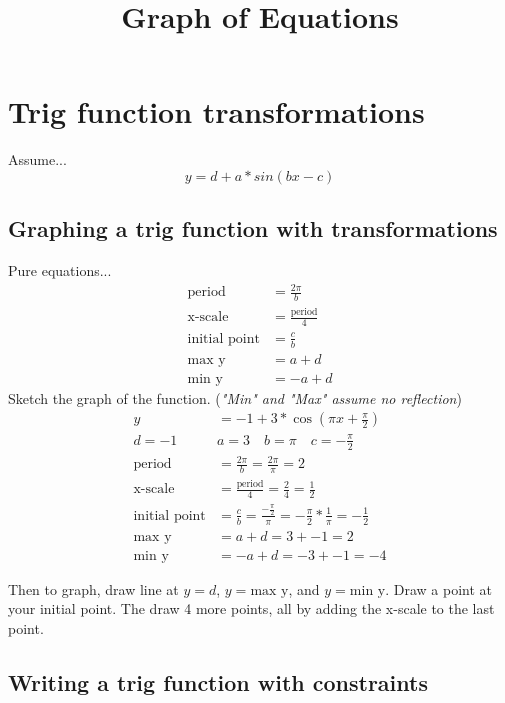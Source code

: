 \documentclass[]{article}
\title{\vspace{-5ex}Graph of Equations \vspace{-5ex}}
\author{}
\date{}
\begin{document}
	\maketitle{}

	\section{Trig function transformations}
	Assume...
	\begin{equation}
		y = d + a * sin(bx - c)
	\end{equation}
	\subsection*{Graphing a trig function with transformations}
	Pure equations...
	\begin{align*}
		\text{period} &= \frac{2\pi}{b} \\
		\text{x-scale} &= \frac{\text{period}}{4} \\
		\text{initial point} &= \frac{c}{b} \\
		\text{max y} &= a + d \\
		\text{min y} &= -a + d
	\end{align*}
	Sketch the graph of the function. (\emph{"Min" and "Max" assume no reflection})
	\begin{align*}
		y &= -1 + 3 * \cos(\pi x + \frac{\pi}{2}) \\
		d = -1 \quad &a = 3 \quad b = \pi \quad c = -\frac{\pi}{2} \\
		\text{period} &= \frac{2\pi}{b} = \frac{2\pi}{\pi} = 2 \\
		\text{x-scale} &= \frac{\text{period}}{4} = \frac{2}{4} = \frac{1}{2} \\
		\text{initial point}  &= \frac{c}{b} = \frac{-\frac{\pi}{2}}{\pi} = -\frac{\pi}{2} * \frac{1}{\pi} = -\frac{1}{2} \\
		\text{max y} &= a + d = 3 + -1 = 2 \\
		\text{min y} &= -a + d = -3 + -1 = -4
	\end{align*}
	\par Then to graph, draw line at $y=d$, $y=\text{max y}$, and $y=\text{min y}$. Draw a point at your initial point. The draw 4 more points, all by adding the x-scale to the last point.
	
	\subsection*{Writing a trig function with constraints}
	
\end{document}
